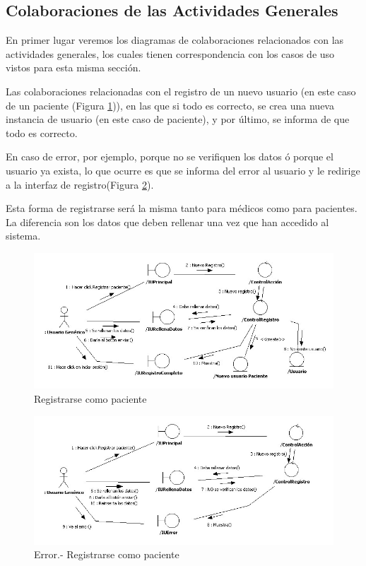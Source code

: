 \documentclass[a4paper,oneside,11pt]{book}
\begin{document}
		\subsection{Colaboraciones de las Actividades Generales} %
		\label{sub:colaboraciones_de_las_actividades_generales}
		
			En primer lugar veremos los diagramas de colaboraciones relacionados con las actividades generales, los cuales tienen correspondencia con los casos de uso vistos para esta misma sección.
			
			Las colaboraciones relacionadas con el registro de un nuevo usuario (en este caso de un paciente (Figura \ref{fig:col_reg_paciente})), en las que si todo es correcto, se crea una nueva instancia de usuario (en este caso de paciente), y por último, se informa de que todo es correcto. 
			
			En caso de error, por ejemplo, porque no se verifiquen los datos ó porque el usuario ya exista, lo que ocurre es que se informa del error al usuario y le redirige a la interfaz de registro(Figura \ref{fig:col_reg_paciente_err}).
			
			Esta forma de registrarse será la misma tanto para médicos como para pacientes. La diferencia son los datos que deben rellenar una vez que han accedido al sistema.
			
			\bigskip
			\bigskip
			
			\begin{figure}[H]
			  \centering
			    \includegraphics[width=16cm]{img/jpg/colaboraciones/17_Registrarse_paciente.jpg}
			  \caption{Registrarse como paciente}
			  \label{fig:col_reg_paciente}
			\end{figure}
		
			\begin{figure}[H]
			  \centering
			    \includegraphics[width=16cm]{img/jpg/colaboraciones/18_RegistrarsePacienteError.jpg}
			  \caption{Error.- Registrarse como paciente}
			  \label{fig:col_reg_paciente_err}
			\end{figure}
			
\end{document}
